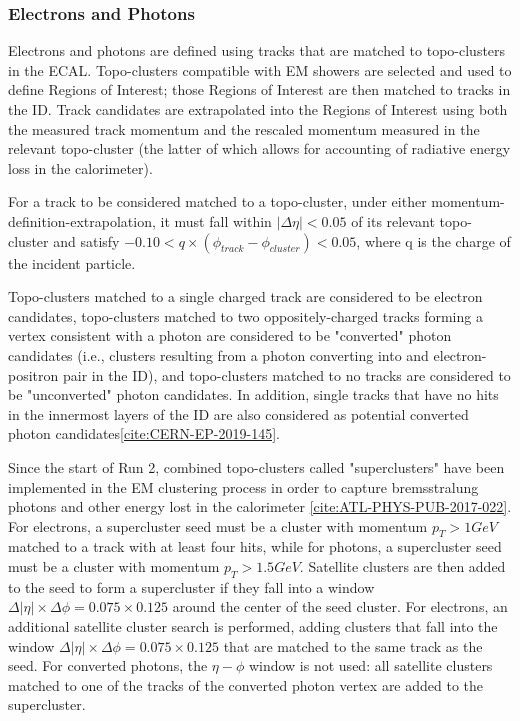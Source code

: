 \subsubsection{Electrons and Photons} \label{sec:Electrons} 

Electrons and photons are defined using tracks that are matched to topo-clusters in the ECAL. Topo-clusters compatible with EM showers are selected and used to define Regions of Interest; those Regions of Interest are then matched to tracks in the ID. Track candidates are extrapolated into the Regions of Interest using both the measured track momentum and the rescaled momentum measured in the relevant topo-cluster (the latter of which allows for accounting of radiative energy loss in the calorimeter). 

For a track to be considered matched to a topo-cluster, under either momentum-definition-extrapolation, it must fall within $|\Delta \eta| < 0.05$ of its relevant topo-cluster and satisfy $-0.10 < q \times (\phi_{track}-\phi_{cluster}) < 0.05$, where q is the charge of the incident particle. 

Topo-clusters matched to a single charged track are considered to be electron candidates, topo-clusters matched to two oppositely-charged tracks forming a vertex consistent with a photon are considered to be "converted" photon candidates (i.e., clusters resulting from a photon converting into and electron-positron pair in the ID), and topo-clusters matched to no tracks are considered to be "unconverted" photon candidates. In addition, single tracks that have no hits in the innermost layers of the ID are also considered as potential converted photon candidates\ref{cite:CERN-EP-2019-145}. 

Since the start of Run 2, combined topo-clusters called "superclusters" have been implemented in the EM clustering process in order to capture bremsstralung photons and other energy lost in the calorimeter \ref{cite:ATL-PHYS-PUB-2017-022}. For electrons, a supercluster seed must be a cluster with momentum $p_{T} > 1 GeV$ matched to a track with at least four hits, while for photons, a supercluster seed must be a cluster with momentum $p_{T} > 1.5 GeV$. Satellite clusters are then added to the seed to form a supercluster if they fall into a window $\Delta |\eta| \times \Delta\phi = 0.075 \times 0.125$ around the center of the seed cluster. For electrons, an additional satellite cluster search is performed, adding clusters that fall into the window $\Delta |\eta| \times \Delta\phi = 0.075 \times 0.125$ that are matched to the same track as the seed. For converted photons, the $\eta-\phi$ window is not used: all satellite clusters matched to one of the tracks of the converted photon vertex are added to the supercluster.

